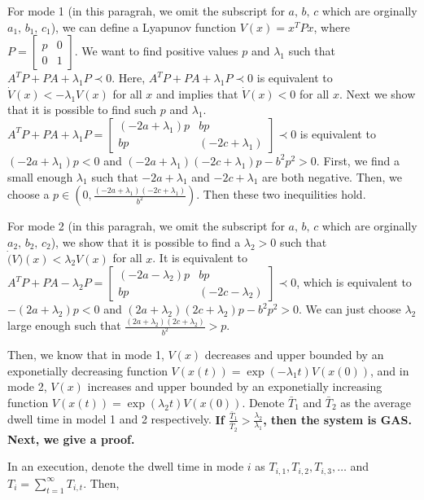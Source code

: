 \documentclass[11pt]{article}
\begin{document}
For mode 1 (in this paragrah, we omit the subscript for $a,\,b,\,c$ which are orginally $a_1,\,b_1,\,c_1$), we can define a Lyapunov function $V(x) = x^T P x$, where $P = \begin{bmatrix} p & 0\\ 0 & 1\end{bmatrix}$. We want to find positive values $p$ and $\lambda_1$ such that $A^TP + PA + \lambda_1 P \prec 0$. Here, $A^TP + PA + \lambda_1 P \prec 0$ is equivalent to $\dot{V}(x) < -\lambda_1 V(x)$ for all $x$ and implies that $\dot{V}(x) < 0$ for all $x$. Next we show that it is possible to find such $p$ and $\lambda_1$. $A^TP + PA + \lambda_1 P = \begin{bmatrix} (-2a+\lambda_1)p & bp\\ bp & (-2c+\lambda_1)\end{bmatrix} \prec 0$ is equivalent to $(-2a+\lambda_1)p < 0$ and $(-2a+\lambda_1)(-2c+\lambda_1)p - b^2p^2 > 0$. First, we find a small enough $\lambda_1$ such that $-2a+\lambda_1$ and $-2c+\lambda_1$ are both negative. Then, we choose a $p \in (0, \frac{(-2a+\lambda_1)(-2c+\lambda_1)}{b^2})$. Then these two inequilities hold.

For mode 2 (in this paragrah, we omit the subscript for $a,\,b,\,c$ which are orginally $a_2,\,b_2,\,c_2$), we show that it is possible to find a $\lambda_2 > 0$ such that $\dot(V)(x) < \lambda_2 V(x)$ for all $x$. It is equivalent to $A^TP + PA - \lambda_2 P = \begin{bmatrix} (-2a-\lambda_2)p & bp\\ bp & (-2c-\lambda_2)\end{bmatrix} \prec 0$, which is equivalent to $-(2a+\lambda_2)p < 0$ and $(2a+\lambda_2)(2c+\lambda_2)p - b^2p^2 > 0$. We can just choose $\lambda_2$ large enough such that $\frac{(2a+\lambda_2)(2c+\lambda_2)}{b^2} > p$.

Then, we know that in mode 1, $V(x)$ decreases and upper bounded by an exponetially decreasing function $V(x(t)) = \exp(-\lambda_1 t) V(x(0))$, and in mode 2, $V(x)$ increases and upper bounded by an exponetially increasing function $V(x(t)) = \exp(\lambda_2 t) V(x(0))$. Denote $\bar{T}_1$ and $\bar{T}_2$ as the average dwell time in model 1 and 2 respectively. \textbf{If $\frac{\bar{T}_1}{\bar{T}_2} > \frac{\lambda_2}{\lambda_1}$, then the system is GAS. Next, we give a proof.}

In an execution, denote the dwell time in mode $i$ as $T_{i,1}, T_{i,2}, T_{i,3}, \dots$ and $T_i = \sum_{t=1}^{\infty} T_{i, t}$. Then,
\end{document}
